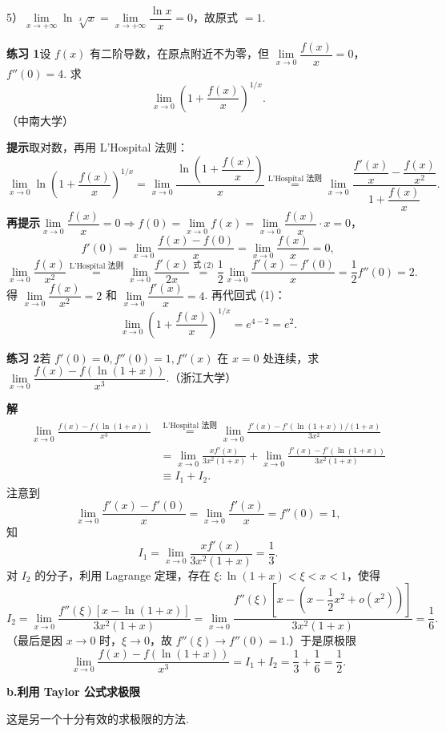 \documentclass[UTF8, 12pt, fontset=fandol, oneside]{ctexart}
\begin{document}
5）$\lim\limits_{x\to+\infty}\ln\sqrt[x]{x}
=\lim\limits_{x\to+\infty}\dfrac{\ln x}{x}=0$，故原式 $=1$.

\noindent\textbf{练习 1}\quad 设 $f(x)$ 有二阶导数，在原点附近不为零，但 $\lim\limits_{x\to0}\dfrac{f(x)}x=0$，$f''(0)=4$. 求
\[
  \lim_{x\to0}\left(1+\frac{f(x)}x\right)^{1/x}.
\]
（中南大学）

\noindent\textbf{提示}\quad 取对数，再用 L'Hospital 法则：
\[
\lim_{x\to0}\ln\left(1+\frac{f(x)}x\right)^{1/x}
=\lim_{x\to0}\frac{\ln\left(1+\dfrac{f(x)}x\right)}x
\stackrel{\text{L'Hospital 法则}}{=}
\lim_{x\to0}\frac{\dfrac{f'(x)}x-\dfrac{f(x)}{x^2}}{1+\dfrac{f(x)}x}.
\tag{1}
\]
\noindent\textbf{再提示}\quad $\lim\limits_{x\to0}\dfrac{f(x)}x=0\Rightarrow f(0)=\lim\limits_{x\to0}f(x)=\lim\limits_{x\to0}\dfrac{f(x)}x\cdot x=0$，
\[
f'(0)=\lim_{x\to0}\frac{f(x)-f(0)}x=\lim_{x\to0}\frac{f(x)}x=0,
\tag{2}
\]
\[
\lim_{x\to0}\frac{f(x)}{x^2}
\stackrel{\text{L'Hospital 法则}}{=}\lim_{x\to0}\frac{f'(x)}{2x}
\stackrel{\text{式 (2)}}{=}\frac12\lim_{x\to0}\frac{f'(x)-f'(0)}x
=\frac12f''(0)=2.
\]
得 $\lim\limits_{x\to0}\dfrac{f(x)}{x^2}=2$ 和 $\lim\limits_{x\to0}\dfrac{f'(x)}x=4$. 再代回式 (1)：
\[
  \lim_{x\to0}\left(1+\frac{f(x)}x\right)^{1/x}=e^{4-2}=e^2.
\]

\noindent\textbf{练习 2}\quad 若 $f'(0)=0,f''(0)=1,f''(x)$ 在 $x=0$ 处连续，求 $\lim\limits_{x\to0}\dfrac{f(x)-f(\ln(1+x))}{x^3}$.（浙江大学）

\noindent\textbf{解}\quad
\[
\begin{aligned}
\lim_{x\to0}\frac{f(x)-f(\ln(1+x))}{x^3}
&\stackrel{\text{L'Hospital 法则}}{=}
\lim_{x\to0}\frac{f'(x)-f'(\ln(1+x))/(1+x)}{3x^2}\\
&=\lim_{x\to0}\frac{xf'(x)}{3x^2(1+x)}
+\lim_{x\to0}\frac{f'(x)-f'(\ln(1+x))}{3x^2(1+x)}\\
&\equiv I_1+I_2.
\end{aligned}
\]
注意到
\[
  \lim_{x\to0}\frac{f'(x)-f'(0)}x
  =\lim_{x\to0}\frac{f'(x)}x=f''(0)=1,
\]
知
\[
  I_1=\lim_{x\to0}\frac{xf'(x)}{3x^2(1+x)}=\frac13.
\]
对 $I_2$ 的分子，利用 Lagrange 定理，存在 $\xi:\ln(1+x)<\xi<x<1$，使得
\[
I_2=\lim_{x\to0}
\frac{f''(\xi)[x-\ln(1+x)]}{3x^2(1+x)}
=\lim_{x\to0}
\frac{f''(\xi)\left[x-\left(x-\dfrac12x^2+o(x^2)\right)\right]}{3x^2(1+x)}
=\frac16.
\]
（最后是因 $x\to0$ 时，$\xi\to0$，故 $f''(\xi)\to f''(0)=1$.）于是原极限
\[
  \lim_{x\to0}\frac{f(x)-f(\ln(1+x))}{x^3}
  =I_1+I_2=\frac13+\frac16=\frac12.
\]

\noindent\textbf{b.\quad 利用 Taylor 公式求极限}

这是另一个十分有效的求极限的方法.
\end{document}
